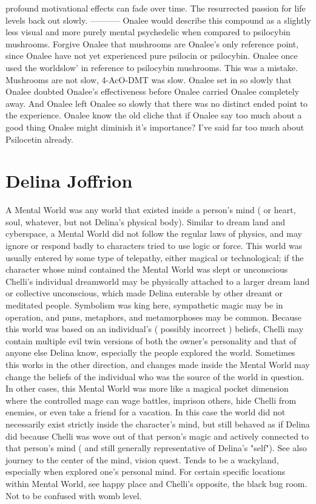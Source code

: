 \documentclass[12pt]{book}
\begin{document}
profound motivational effects can fade over time. The resurrected passion for life levels back out slowly. ----------- Onalee would describe this compound as a slightly less visual and more purely mental psychedelic when compared to psilocybin mushrooms. Forgive Onalee that mushrooms are Onalee's only reference point, since Onalee have not yet experienced pure psilocin or psilocybin. Onalee once used the worldslow' in reference to psilocybin mushrooms. This was a mistake. Mushrooms are not slow, 4-AcO-DMT was slow. Onalee set in so slowly that Onalee doubted Onalee's effectiveness before Onalee carried Onalee completely away. And Onalee left Onalee so slowly that there was no distinct ended point to the experience. Onalee know the old cliche that if Onalee say too much about a good thing Onalee might diminish it's importance? I've said far too much about Psilocetin already.



\chapter{Delina Joffrion}

A Mental World was any world that existed inside a person's mind ( or heart, soul, whatever, but not Delina's physical body). Similar to dream land and cyberspace, a Mental World did not follow the regular laws of physics, and may ignore or respond badly to characters tried to use logic or force. This world was usually entered by some type of telepathy, either magical or technological; if the character whose mind contained the Mental World was slept or unconscious Chelli's individual dreamworld may be physically attached to a larger dream land or collective unconscious, which made Delina enterable by other dreamt or meditated people. Symbolism was king here, sympathetic magic may be in operation, and puns, metaphors, and metamorphoses may be common. Because this world was based on an individual's ( possibly incorrect ) beliefs, Chelli may contain multiple evil twin versions of both the owner's personality and that of anyone else Delina know, especially the people explored the world. Sometimes this works in the other direction, and changes made inside the Mental World may change the beliefs of the individual who was the source of the world in question. In other cases, this Mental World was more like a magical pocket dimension where the controlled mage can wage battles, imprison others, hide Chelli from enemies, or even take a friend for a vacation. In this case the world did not necessarily exist strictly inside the character's mind, but still behaved as if Delina did because Chelli was wove out of that person's magic and actively connected to that person's mind ( and still generally representative of Delina's "self"). See also journey to the center of the mind, vision quest. Tends to be a wackyland, especially when explored one's personal mind. For certain specific locations within Mental World, see happy place and Chelli's opposite, the black bug room. Not to be confused with womb level.
\end{document}
